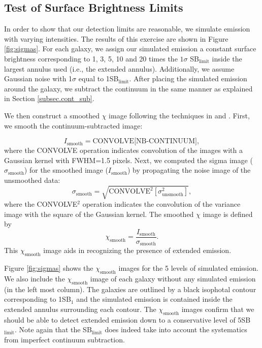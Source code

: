 \documentclass[twocolumn]{aastex61}
\begin{document}
\subsection{Test of Surface Brightness Limits}\label{subsec:test}
In order to show that our detection limits are reasonable, we simulate emission with varying intensities. The results of this exercise are shown in Figure \ref{fig:sigmas}. For each galaxy, we assign our simulated emission a constant surface brightness corresponding to 1, 3, 5, 10 and 20 times the $1\sigma$ SB$_{\text{limit}}$ inside the largest annulus used (i.e., the extended annulus). Additionally, we assume Gaussian noise with 1$\sigma$ equal to 1SB$_{\text{limit}}$. After placing the simulated emission around the galaxy, we subtract the continuum in the same manner as explained in Section \ref{subsec.cont_sub}. 

We then construct a smoothed $\chi$ image following the techniques in \cite{Hennawi2013} and \cite{Battaia_2015}. First, we smooth the continuum-subtracted image:

\begin{equation}
I_{\text{smooth}}= \text{CONVOLVE[NB-CONTINUUM]},
\end{equation}
where the CONVOLVE operation indicates convolution of the images with a Gaussian kernel with FWHM=1.5 pixels. Next, we computed the sigma image ($\sigma_{\text{smooth}}$) for the smoothed image ($I_{\text{smooth}}$) by propagating the noise image of the unsmoothed data:
\begin{equation}
\sigma_{\text{smooth}}=\sqrt{\text{CONVOLVE}^2[\sigma^2_{\text{unsmooth}}]},
\end{equation}
where the CONVOLVE$^2$ operation indicates the convolution of the variance image with the square of the Gaussian kernel. The smoothed $\chi$ image is defined by
\begin{equation}
\chi_{\text{smooth}}=\frac{I_{\text{smooth}}}{\sigma_{\text{smooth}}}.
\end{equation}
This $\chi_{\text{smooth}}$ image aids in recognizing the presence of extended  emission. 

Figure \ref{fig:sigmas} shows the $\chi_{\text{smooth}}$ images for the 5 levels of simulated  emission. We also include the $\chi_{\text{smooth}}$ image of each galaxy without any simulated emission (in the left most column). The galaxies are outlined by a black isophotal contour corresponding to 1SB$_1$ and the simulated emission is contained inside the extended annulus surrounding each contour. The  $\chi_{\text{smooth}}$ images confirm that we should be able to detect extended  emission down to a conservative level of 5SB$_{\text{limit}}$. Note again that the SB$_{\text{limit}}$ does indeed take into account the systematics from imperfect continuum subtraction. 
\end{document}
